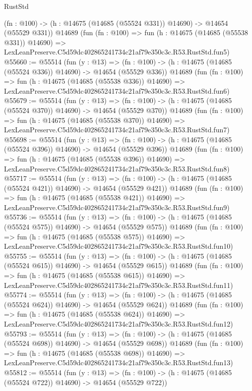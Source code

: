 \begin{lexlean}{RustStd}
\begin{coremodule}
    (fn : @100) -> (h : @14675 (@14685 (@55524 @331)) @14690) -> @14654 (@55529 @331))
    @14689
    (fun (fn : @100) =>
    fun (h : @14675 (@14685 (@55538 @331)) @14690) =>
    LexLeanPreserve.C5d59dc402865241734c21af79e350c3c.R53.RustStd.fun5)
@55660 := @55514
    (fun (y : @13) =>
    (fn : @100) -> (h : @14675 (@14685 (@55524 @336)) @14690) -> @14654 (@55529 @336))
    @14689
    (fun (fn : @100) =>
    fun (h : @14675 (@14685 (@55538 @336)) @14690) =>
    LexLeanPreserve.C5d59dc402865241734c21af79e350c3c.R53.RustStd.fun6)
@55679 := @55514
    (fun (y : @13) =>
    (fn : @100) -> (h : @14675 (@14685 (@55524 @370)) @14690) -> @14654 (@55529 @370))
    @14689
    (fun (fn : @100) =>
    fun (h : @14675 (@14685 (@55538 @370)) @14690) =>
    LexLeanPreserve.C5d59dc402865241734c21af79e350c3c.R53.RustStd.fun7)
@55698 := @55514
    (fun (y : @13) =>
    (fn : @100) -> (h : @14675 (@14685 (@55524 @396)) @14690) -> @14654 (@55529 @396))
    @14689
    (fun (fn : @100) =>
    fun (h : @14675 (@14685 (@55538 @396)) @14690) =>
    LexLeanPreserve.C5d59dc402865241734c21af79e350c3c.R53.RustStd.fun8)
@55717 := @55514
    (fun (y : @13) =>
    (fn : @100) -> (h : @14675 (@14685 (@55524 @421)) @14690) -> @14654 (@55529 @421))
    @14689
    (fun (fn : @100) =>
    fun (h : @14675 (@14685 (@55538 @421)) @14690) =>
    LexLeanPreserve.C5d59dc402865241734c21af79e350c3c.R53.RustStd.fun9)
@55736 := @55514
    (fun (y : @13) =>
    (fn : @100) -> (h : @14675 (@14685 (@55524 @575)) @14690) -> @14654 (@55529 @575))
    @14689
    (fun (fn : @100) =>
    fun (h : @14675 (@14685 (@55538 @575)) @14690) =>
    LexLeanPreserve.C5d59dc402865241734c21af79e350c3c.R53.RustStd.fun10)
@55755 := @55514
    (fun (y : @13) =>
    (fn : @100) -> (h : @14675 (@14685 (@55524 @615)) @14690) -> @14654 (@55529 @615))
    @14689
    (fun (fn : @100) =>
    fun (h : @14675 (@14685 (@55538 @615)) @14690) =>
    LexLeanPreserve.C5d59dc402865241734c21af79e350c3c.R53.RustStd.fun11)
@55774 := @55514
    (fun (y : @13) =>
    (fn : @100) -> (h : @14675 (@14685 (@55524 @624)) @14690) -> @14654 (@55529 @624))
    @14689
    (fun (fn : @100) =>
    fun (h : @14675 (@14685 (@55538 @624)) @14690) =>
    LexLeanPreserve.C5d59dc402865241734c21af79e350c3c.R53.RustStd.fun12)
@55793 := @55514
    (fun (y : @13) =>
    (fn : @100) -> (h : @14675 (@14685 (@55524 @698)) @14690) -> @14654 (@55529 @698))
    @14689
    (fun (fn : @100) =>
    fun (h : @14675 (@14685 (@55538 @698)) @14690) =>
    LexLeanPreserve.C5d59dc402865241734c21af79e350c3c.R53.RustStd.fun13)
@55812 := @55514
    (fun (y : @13) =>
    (fn : @100) -> (h : @14675 (@14685 (@55524 @722)) @14690) -> @14654 (@55529 @722))

\end{coremodule}
\end{lexlean}

